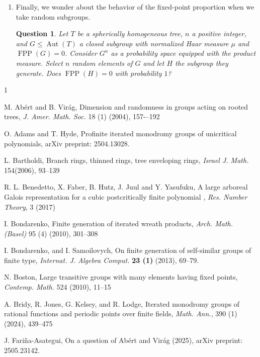\documentclass{amsart}
\DeclareMathOperator{\Aut}{Aut}
\DeclareMathOperator{\FPP}{FPP}
\newtheorem{Question}[Proposition]{Question}
\begin{document}
\begin{enumerate}
\item Finally, we wonder about the behavior of the fixed-point proportion when we take random subgroups. 

\begin{Question}
Let $T$ be a spherically homogeneous tree, $n$ a positive integer, and $G \leq \Aut(T)$ a closed subgroup with normalized Haar measure $\mu$ and $\FPP(G) = 0$. Consider $G^n$ as a probability space equipped with the product measure. Select $n$ random elements of $G$ and let $H$ the subgroup they generate. Does $\FPP(H) = 0$ with probability $1$?
\label{question: FPP random subgroups}
\end{Question}
\end{enumerate}


\begin{thebibliography}{1}

M. Abért and B. Virág, Dimension and randomness in groups acting on rooted trees, \textit{J. Amer. Math. Soc.} 18 (1) (2004), 157-–192

O. Adams and T. Hyde, Profinite iterated monodromy groups of unicritical polynomials, arXiv preprint: 2504.13028.

L. Bartholdi, Branch rings, thinned rings, tree enveloping rings, \textit{Israel J. Math.} 154(2006), 93--139


R. L. Benedetto, X. Faber, B. Hutz, J. Juul and Y. Yasufuku, A large arboreal {G}alois representation for a cubic postcritically finite polynomial , \textit{Res. Number Theory}, 3 (2017)

I. Bondarenko, Finite generation of iterated wreath products, \textit{Arch. Math. (Basel)} 95 (4) (2010), 301--308

I. Bondarenko, and I. Samoilovych, On finite generation of self-similar groups of finite type, \textit{Internat. J. Algebra Comput.} \textbf{23 (1)} (2013), 69--79.

N. Boston, Large transitive groups with many elements having fixed points, \textit{Contemp. Math.} 524 (2010), 11--15

A. Bridy, R. Jones, G. Kelsey, and R. Lodge, Iterated monodromy groups of rational functions and periodic points over finite fields, \textit{Math. Ann.}, 390 (1) (2024), 439--475

J. Fariña-Asategui, On a question of Abért and Virág (2025), arXiv preprint: 2505.23142.


\end{thebibliography}
\end{document}

